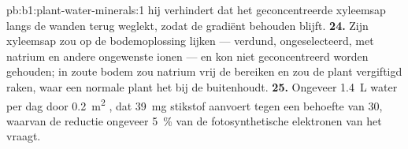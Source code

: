\begin{solution}{pb:b1:plant-water-minerals:1}
hij verhindert dat het geconcentreerde xyleemsap langs de wanden terug
weglekt, zodat de gradiënt behouden blijft.
\textbf{24.} Zijn xyleemsap zou op de bodemoplossing lijken --- verdund,
ongeselecteerd, met natrium en andere ongewenste ionen --- en kon niet
geconcentreerd worden gehouden; in zoute bodem zou natrium vrij de 
bereiken en zou de plant vergiftigd raken, waar een normale plant het bij de
 buitenhoudt.
\textbf{25.} Ongeveer \qty{1.4}{L} water per dag door \qty{0.2}{m^2}
, dat \qty{39}{mg} stikstof aanvoert tegen een behoefte van
\qty{30}{}, waarvan de reductie ongeveer \qty{5}{\%} van de
fotosynthetische elektronen van het  vraagt.
\end{solution}
